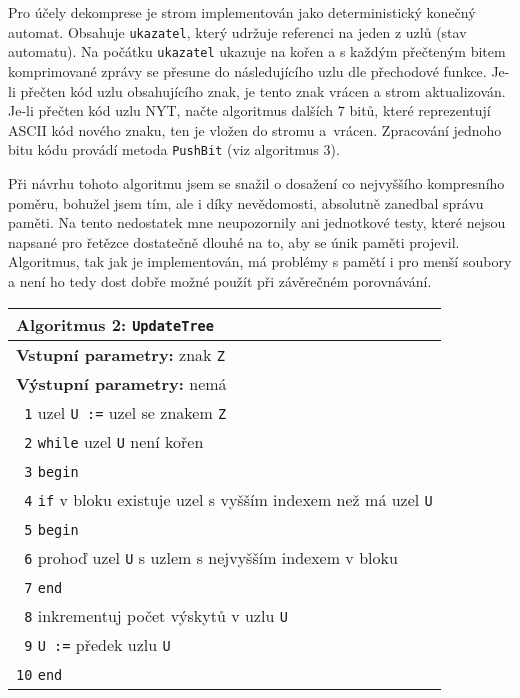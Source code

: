 Pro účely dekomprese je strom implementován jako deterministický konečný automat. Obsahuje \texttt{ukazatel}, který udržuje referenci na jeden z uzlů (stav automatu). Na počátku \texttt{ukazatel} ukazuje na kořen a s každým přečteným bitem komprimované zprávy se přesune do následujícího uzlu dle přechodové funkce. Je-li přečten kód uzlu obsahujícího znak, je tento znak vrácen a strom aktualizován. Je-li přečten kód uzlu NYT, načte algoritmus dalších 7 bitů, které reprezentují ASCII kód nového znaku, ten je vložen do stromu a~vrácen. Zpracování jednoho bitu kódu provádí metoda \texttt{PushBit} (viz algoritmus 3).

\newpage
Při návrhu tohoto algoritmu jsem se snažil o dosažení co nejvyššího kompresního poměru, bohužel jsem tím, ale i díky nevědomosti, absolutně zanedbal správu paměti. Na tento nedostatek mne neupozornily ani jednotkové testy, které nejsou napsané pro řetězce dostatečně dlouhé na to, aby se únik paměti projevil. Algoritmus, tak jak je implementován, má problémy s pamětí i pro menší soubory a není ho tedy dost dobře možné použít při závěrečném porovnávání.

\begin{table}[!h]
\centering
\begin{tabular}{|l|}
\hline
\textbf{Algoritmus 2:} \texttt{UpdateTree}\\
\hline
\textbf{Vstupní parametry:} znak \texttt{Z}\\
\textbf{Výstupní parametry:} nemá\\
\hline
\texttt{ 1} uzel \texttt{U :=} uzel se znakem \texttt{Z}\\
\texttt{ 2} \texttt{while} uzel \texttt{U} není kořen\\
\texttt{ 3} \texttt{begin}\\
\texttt{ 4} \hspace*{5mm}\texttt{if} v bloku existuje uzel s vyšším indexem než má uzel \texttt{U}\\
\texttt{ 5} \hspace*{5mm}\texttt{begin}\\
\texttt{ 6} \hspace*{10mm}prohoď uzel \texttt{U} s uzlem s nejvyšším indexem v bloku\\
\texttt{ 7} \hspace*{5mm}\texttt{end}\\
\texttt{ 8} \hspace*{5mm}inkrementuj počet výskytů v uzlu \texttt{U}\\
\texttt{ 9} \hspace*{5mm}\texttt{U :=} předek uzlu \texttt{U}\\
\texttt{10} \texttt{end}\\
\hline
\end{tabular}
\end{table}



